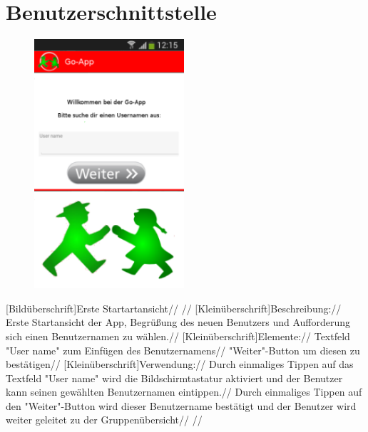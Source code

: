 \section{Benutzerschnittstelle}
\begin{figure}
\includegraphics[scale =1]{resources/images/startansicht.png}
\end{figure}
[Bildüberschrift]Erste Startartansicht// //
[Kleinüberschrift]Beschreibung://
Erste Startansicht der App, Begrüßung des neuen Benutzers und Aufforderung sich einen Benutzernamen zu wählen.//
[Kleinüberschrift]Elemente://
Textfeld "User name" zum Einfügen des Benutzernamens//
"Weiter"-Button um diesen zu bestätigen//
[Kleinüberschrift]Verwendung://
Durch einmaliges Tippen auf das Textfeld "User name" wird die Bildschirmtastatur aktiviert und der Benutzer kann seinen gewählten Benutzernamen eintippen.//
Durch einmaliges Tippen auf den "Weiter"-Button wird dieser Benutzername bestätigt und der Benutzer wird weiter geleitet zu der Gruppenübersicht// //

